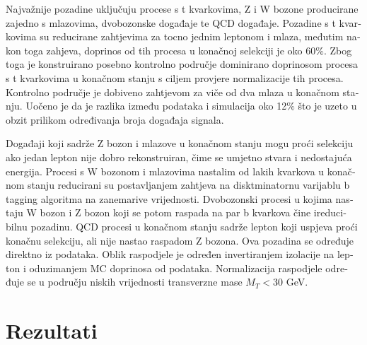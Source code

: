 \begin{otherlanguage}{croatian}
Najvažnije pozadine uključuju procese s t kvarkovima, Z i W bozone producirane zajedno s mlazovima, dvobozonske događaje te QCD događaje. Pozadine s t kvarkovima su reducirane zahtjevima za tocno jednim leptonom i mlaza, međutim nakon toga zahjeva, doprinos od tih procesa u konačnoj selekciji je oko 60$\%$. Zbog toga je konstruirano posebno kontrolno područje dominirano doprinosom procesa s t kvarkovima u konačnom stanju s ciljem provjere normalizacije tih procesa. Kontrolno područje je dobiveno zahtjevom za viče od dva mlaza u konačnom stanju. Uočeno je da je razlika između podataka i simulacija oko 12$\%$ što je uzeto u obzit prilikom određivanja broja događaja signala. 
\par Događaji koji sadrže Z bozon i mlazove u konačnom stanju mogu proći selekciju ako jedan lepton nije dobro rekonstruiran, čime se umjetno stvara i nedostajuća energija. Procesi s W bozonom i mlazovima nastalim od lakih kvarkova u konačnom stanju reducirani su postavljanjem zahtjeva na disktminatornu varijablu b tagging algoritma  na zanemarive vrijednosti. Dvobozonski procesi u kojima nastaju W bozon i Z bozon koji se potom raspada na par b kvarkova čine ireducibilnu pozadinu. QCD procesi u konačnom stanju sadrže lepton koji uspjeva proći konačnu selekciju, ali nije nastao raspadom Z bozona. Ova pozadina se određuje direktno iz podataka. Oblik raspodjele je određen invertiranjem izolacije na lepton i oduzimanjem MC doprinosa od podataka. Normalizacija raspodjele određuje se u području niskih vrijednosti transverzne mase $M_T<$30 GeV.

\section{Rezultati}


\end{otherlanguage}
